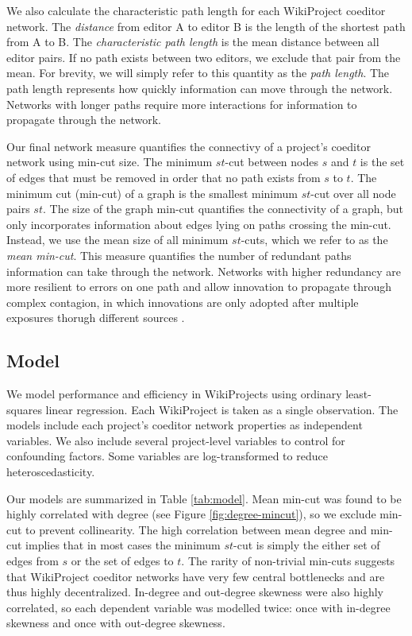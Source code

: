 \documentclass[10pt,twocolumn]{article}
\newcommand{\+}{\phantom{-}}
\begin{document}
We also calculate the characteristic path length for each WikiProject coeditor network.
The {\em distance} from editor A to editor B is the length of the shortest path from A to B.
The {\em characteristic path length} is the mean distance between all editor pairs.
If no path exists between two editors, we exclude that pair from the mean.
For brevity, we will simply refer to this quantity as the {\em path length}.
The path length represents how quickly information can move through the network.
Networks with longer paths require more interactions for information to propagate through
the network.

Our final network measure quantifies the connectivy of a project's coeditor network using
min-cut size.
The minimum $st$-cut between nodes $s$ and $t$ is the set of edges that must be removed in order that
no path exists from $s$ to $t$.
The minimum cut (min-cut) of a graph is the smallest minimum $st$-cut over all node pairs $st$. 
The size of the graph min-cut quantifies the connectivity of a graph,
but only incorporates information about edges lying on paths crossing the min-cut.
Instead, we use the mean size of all minimum $st$-cuts, which we refer to as the
{\em mean min-cut}.
This measure quantifies the number of redundant paths information can take through the network.
Networks with higher redundancy are more resilient to errors on one path \cite{}
and allow innovation to propagate through complex contagion,
in which innovations are only adopted after multiple exposures thorugh different sources
\cite{}.

\subsection{Model}

We model performance and efficiency in WikiProjects using ordinary least-squares linear regression.
Each WikiProject is taken as a single observation.
The models include each project's coeditor network properties as independent variables.
We also include several project-level variables to control for confounding factors.
Some variables are log-transformed to reduce heteroscedasticity.

Our models are summarized in Table \ref{tab:model}.
Mean min-cut was found to be highly correlated with degree (see Figure \ref{fig:degree-mincut}),
so we exclude min-cut to prevent collinearity.
The high correlation between mean degree and min-cut implies that in most cases
the minimum $st$-cut is simply the either set of edges from $s$ or the set of edges to $t$.
The rarity of non-trivial min-cuts suggests that WikiProject coeditor networks have very few central
bottlenecks and are thus highly decentralized.
In-degree and out-degree skewness were also highly correlated, so each dependent variable was modelled twice:
once with in-degree skewness and once with out-degree skewness.
\end{document}
